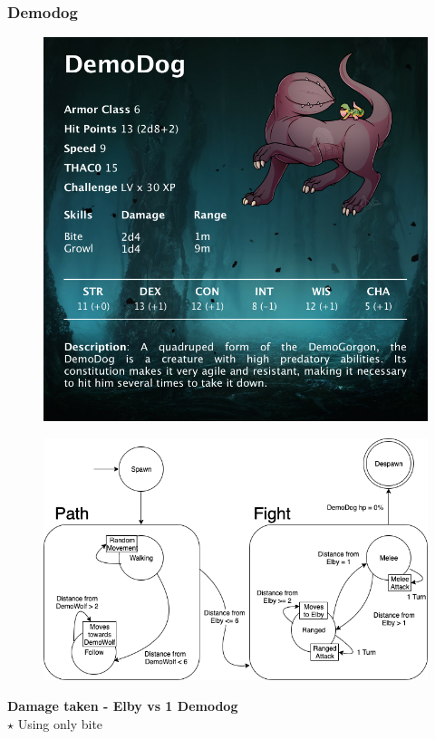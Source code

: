 \subsubsection{Demodog}
\vspace*{0.3cm}
\begin{figure}[H]
	\centering
	\includegraphics[width=0.9\linewidth]{images/visual_stats/demodog.png}
\end{figure}
\newpage
\begin{figure}[H]
	\centering
	\includegraphics[width=0.8\linewidth]{images/graphs/fsa/fsa_demodog.png}
\end{figure}
\vspace*{4mm}
\textbf{Damage taken - Elby vs 1 Demodog}\\
\newline
$\star$ Using only bite\\
